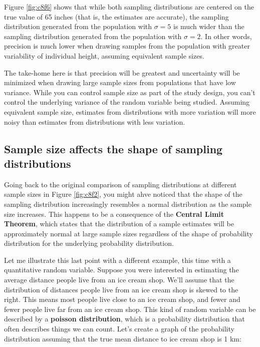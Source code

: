 \documentclass[
]{book}
\begin{document}
Figure \ref{fig:c8f6} shows that while both sampling distributions are centered on the true value of 65 inches (that is, the estimates are accurate), the sampling distribution generated from the population with \(\sigma=5\) is much wider than the sampling distribution generated from the population with \(\sigma=2\). In other words, precision is much lower when drawing samples from the population with greater variability of individual height, assuming equivalent sample sizes.

The take-home here is that precision will be greatest and uncertainty will be minimized when drawing large sample sizes from populations that have low variance. While you can control sample size as part of the study design, you can't control the underlying variance of the random variable being studied. Assuming equivalent sample size, estimates from distributions with more variation will more noisy than estimates from distributions with less variation.

\subsection{Sample size affects the shape of sampling distributions}\label{sample-size-affects-the-shape-of-sampling-distributions}

Going back to the original comparison of sampling distributions at different sample sizes in Figure \ref{fig:c8f2}, you might ahve noticed that the shape of the sampling distribution increasingly resembles a normal distribution as the sample size increases. This happens to be a consequence of the \textbf{Central Limit Theorem}, which states that the distribution of a sample estimates will be approximately normal at large sample sizes regardless of the shape of probability distribution for the underlying probability distribution.

Let me illustrate this last point with a different example, this time with a quantitative random variable. Suppose you were interested in estimating the average distance people live from an ice cream shop. We'll assume that the distribution of distances people live from an ice cream shop is skewed to the right. This means most people live close to an ice cream shop, and fewer and fewer people live far from an ice cream shop. This kind of random variable can be described by a \textbf{poisson distribution}, which is a probability distribution that often describes things we can count. Let's create a graph of the probability distribution assuming that the true mean distance to ice cream shop is 1 km:
\end{document}
